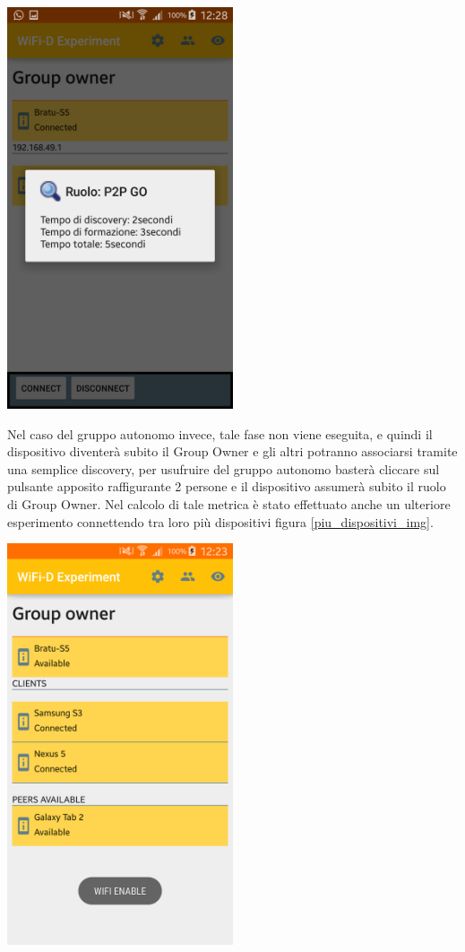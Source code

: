\begin{center}
\includegraphics[width=0.5\textwidth]{imgs/tempo_discovery.png}
\label{tempo_discovery_img}%
\end{center}


Nel caso del gruppo autonomo invece, tale fase non viene eseguita, e quindi il dispositivo diventerà subito il Group Owner e gli altri potranno associarsi tramite una semplice discovery, per usufruire del gruppo autonomo basterà cliccare sul pulsante apposito raffigurante 2 persone e il dispositivo assumerà subito il ruolo di Group Owner.
Nel calcolo di tale metrica è stato effettuato anche un ulteriore esperimento connettendo tra loro più dispositivi figura \ref{piu_dispositivi_img}.

\begin{center}
\includegraphics[width=0.5\textwidth]{imgs/piu_dispositivi.png}
\label{piu_dispositivi_img}%
\end{center}
\newpage


